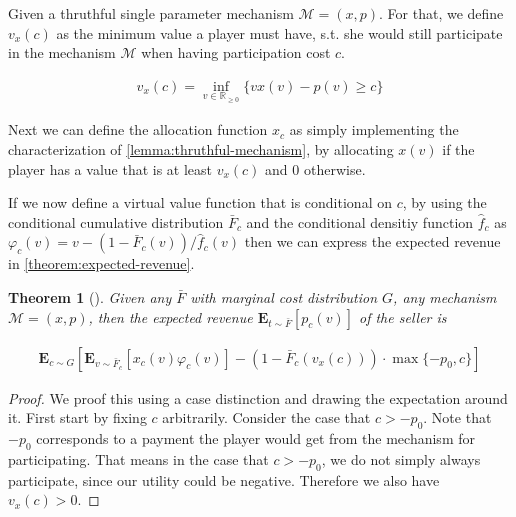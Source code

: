 \documentclass[11pt,a4paper]{article}
\newtheorem{theorem}{Theorem}
\newcommand{\RR}{\ensuremath{\mathbb{R}}}
\begin{document}
\begin{section}{}
 Given a thruthful single parameter mechanism $\mathcal{M}=(x,p)$.
 For that, we define $v_x(c)$ as the minimum value a player must have, s.t. she would still participate in the mechanism $\mathcal{M}$ when having participation cost $c$.

 \begin{align*}
     v_x(c) = \inf_{v \in \RR_{\geq 0}} \{vx(v) - p(v) \geq c\}
 \end{align*}

 Next we can define the allocation function $x_c$ as simply implementing the characterization of \autoref{lemma:thruthful-mechanism},
 by allocating $x(v)$ if the player has a value that is at least $v_x(c)$ and $0$ otherwise.

 If we now define a virtual value function that is conditional on $c$, by using the conditional cumulative distribution $\bar{F}_c$ and the conditional densitiy function $\hat{f}_c$ as
 $\varphi_c(v) = v - (1- \bar{F}_c(v)) / \hat{f}_c(v)$ then we can express the expected revenue in \autoref{theorem:expected-revenue}.

 \begin{theorem}[\cite{primary}]
    \label{theorem:expected-revenue}
     Given any $\bar{F}$ with marginal cost distribution $G$, any mechanism $\mathcal{M}=(x,p)$, then the expected revenue $\mathbf{E}_{t \sim \bar{F}}\left[p_c(v)\right]$ of the seller is

     \begin{align*}
         \mathbf{E}_{c \sim G}\left[\mathbf{E}_{v\sim\bar{F}_c}\left[x_c(v)\varphi_c(v)\right] - (1-\bar{F}_c(v_x(c))) \cdot \max\{-p_0,c\}\right]
     \end{align*}
 \end{theorem}

 \begin{proof}
    We proof this using a case distinction and drawing the expectation around it.
    First start by fixing $c$ arbitrarily.
    Consider the case that $c > -p_0$. Note that $-p_0$ corresponds to a payment the player would get from the mechanism for participating.
    That means in the case that $c > -p_0$, we do not simply always participate, since our utility could be negative. 
    Therefore we also have $v_x(c) > 0$. 
 \end{proof}

\end{section}


\end{document}
